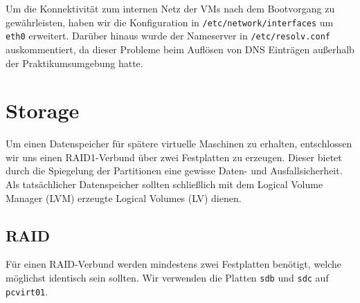 Um die Konnektivität zum internen Netz der VMs nach dem Bootvorgang zu gewährleisten, haben wir die Konfiguration in \verb#/etc/network/interfaces# um \verb#eth0# erweitert. Darüber hinaus wurde der Nameserver in \verb#/etc/resolv.conf# auskommentiert, da dieser Probleme beim Auflösen von DNS Einträgen außerhalb der Praktikumsumgebung hatte.

\chapter{Storage}
Um einen Datenspeicher für spätere virtuelle Maschinen zu erhalten, entschlossen wir uns einen RAID1-Verbund über zwei Festplatten zu erzeugen. Dieser bietet durch die Spiegelung der Partitionen eine gewisse Daten- und Ausfallsicherheit. Als tatsächlicher Datenspeicher sollten schließlich mit dem Logical Volume Manager (LVM) erzeugte Logical Volumes (LV) dienen. 
\section{RAID}
\label{raid}
Für einen RAID-Verbund werden mindestens zwei Festplatten benötigt, welche möglichst identisch sein sollten. Wir verwenden die Platten \verb#sdb# und \verb#sdc# auf \verb#pcvirt01#. 

